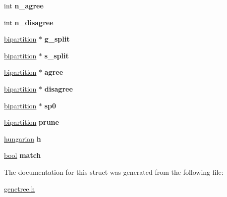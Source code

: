\begin{DoxyCompactItemize}
int {\bfseries n\+\_\+agree}
\item 
\mbox{\label{structsplitset__struct_a1b9ae7e54568a077701202c155e9a452}} 
int {\bfseries n\+\_\+disagree}
\item 
\mbox{\label{structsplitset__struct_aaa363e10399b35c959fb098997fa1ec0}} 
\hyperlink{structbipartition__struct}{bipartition} $\ast$ {\bfseries g\+\_\+split}
\item 
\mbox{\label{structsplitset__struct_ac4f82828f0f20dfe186cb7a9f4175ce2}} 
\hyperlink{structbipartition__struct}{bipartition} $\ast$ {\bfseries s\+\_\+split}
\item 
\mbox{\label{structsplitset__struct_a52c156ca7ddc538c82abeedf6d597b3c}} 
\hyperlink{structbipartition__struct}{bipartition} $\ast$ {\bfseries agree}
\item 
\mbox{\label{structsplitset__struct_afc33a4395225755f920f141e39c7a7dc}} 
\hyperlink{structbipartition__struct}{bipartition} $\ast$ {\bfseries disagree}
\item 
\mbox{\label{structsplitset__struct_a56330277abfeeef40fe27b09c4dfaab9}} 
\hyperlink{structbipartition__struct}{bipartition} $\ast$ {\bfseries sp0}
\item 
\mbox{\label{structsplitset__struct_a635414eb91fc1c5588135c3d2e6285a1}} 
\hyperlink{structbipartition__struct}{bipartition} {\bfseries prune}
\item 
\mbox{\label{structsplitset__struct_a4d1c7adbbcfb9d3e78d8d895ac5988b4}} 
\hyperlink{structhungarian__struct}{hungarian} {\bfseries h}
\item 
\mbox{\label{structsplitset__struct_aef440d73c8ff17adad125b6b61261464}} 
\hyperlink{lowlevel_8h_a97a80ca1602ebf2303258971a2c938e2}{bool} {\bfseries match}
\end{DoxyCompactItemize}


The documentation for this struct was generated from the following file\+:\begin{DoxyCompactItemize}
\item 
\hyperlink{genetree_8h}{genetree.\+h}\end{DoxyCompactItemize}
